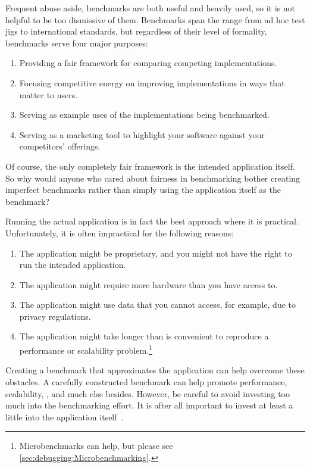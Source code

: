 Frequent abuse aside, benchmarks are both useful and heavily used,
so it is not helpful to be too dismissive of them.
Benchmarks span the range from ad hoc test jigs to international
standards, but regardless of their level of formality, benchmarks
serve four major purposes:

\begin{enumerate}
\item	Providing a fair framework for comparing competing implementations.
\item	Focusing competitive energy on improving implementations in ways
	that matter to users.
\item	Serving as example uses of the implementations being benchmarked.
\item	Serving as a marketing tool to highlight your software
	against your competitors' offerings.
\end{enumerate}

Of course,  the only completely fair framework is the intended
application itself.
So why would anyone who cared about fairness in benchmarking
bother creating imperfect benchmarks rather than simply
using the application itself as the benchmark?

Running the actual application is in fact the best approach where it is practical.
Unfortunately, it is often impractical for the following reasons:

\begin{enumerate}
\item	The application might be proprietary, and you
	might not have the right to run the intended application.
\item	The application might require more hardware
	than you have access to.
\item	The application might use data that you cannot
	access, for example, due to privacy regulations.
\item	The application might take longer than is convenient to
	reproduce a performance or scalability problem.\footnote{
		Microbenchmarks can help, but
		please see \cref{sec:debugging:Microbenchmarking}.}
\end{enumerate}

Creating a benchmark that approximates
the application can help overcome these obstacles.
A carefully constructed benchmark can help promote performance,
scalability, , and much else besides.
However, be careful to avoid investing too much into the benchmarking
effort.
It is after all important to invest at least a little into the
application itself~\cite{Gray91}.

